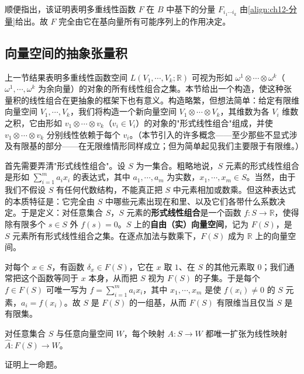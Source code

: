 \documentclass[../../main.tex]{subfiles}
\begin{document}
顺便指出，该证明表明多重线性函数 $F$ 在 $B$ 中基下的分量 $F_{i_1\cdots  i_k}$ 由\eqref{align:ch12-分量}给出。故 $F$ 完全由它在基向量所有可能序列上的作用决定。

\subsection*{向量空间的抽象张量积}

上一节结果表明多重线性函数空间 $L(V_1,\cdots ,V_k;\mathbb{R})$ 可视为形如 $\omega^1\otimes\cdots\otimes\omega^k$（$\omega^1,\cdots ,\omega^k$ 为余向量）的对象的所有线性组合之集。本节给出一个构造，使这种张量积的线性组合在更抽象的框架下也有意义。构造略繁，但想法简单：给定有限维向量空间 $V_1,\cdots ,V_k$，我们将构造一个新向量空间 $V_1\otimes\cdots\otimes V_k$，其维数为各 $V_i$ 维数之积，它由形如 $v_1\otimes\cdots\otimes v_k$（$v_i\in V_i$）的对象的"形式线性组合"组成，并使 $v_1\otimes\cdots\otimes v_k$ 分别线性依赖于每个 $v_i$。（本节引入的许多概念——至少那些不显式涉及有限基的部分——在无限维情形同样成立；但为简单起见我们主要限于有限维。）

首先需要弄清"形式线性组合"。设 $S$ 为一集合。粗略地说，$S$ 元素的形式线性组合是形如 $\sum_{i=1}^m a_i x_i$ 的表达式，其中 $a_1,\cdots ,a_m$ 为实数，$x_1,\cdots ,x_m\in S$。当然，由于我们不假设 $S$ 有任何代数结构，不能真正把 $S$ 中元素相加或数乘。但这种表达式的本质特征是：它完全由 $S$ 中哪些元素出现在和里、以及它们各带什么系数决定。于是定义：对任意集合 $S$，$S$ 元素的\textbf{形式线性组合}是一个函数 $f\colon S\to\mathbb{R}$，使得除有限多个 $s\in S$ 外 $f(s)=0$。$S$ 上的\textbf{自由（实）向量空间}，记为 $F(S)$，是 $S$ 元素所有形式线性组合之集。在逐点加法与数乘下，$F(S)$ 成为 $\mathbb{R}$ 上的向量空间。

对每个 $x\in S$，有函数 $\delta_x\in F(S)$，它在 $x$ 取 $1$、在 $S$ 的其他元素取 $0$；我们通常把这个函数等同于 $x$ 本身，从而把 $S$ 视为 $F(S)$ 的子集。于是每个 $f\in F(S)$ 可唯一写为 $f=\sum_{i=1}^m a_i x_i$，其中 $x_1,\cdots ,x_m$ 是使 $f(x_i)\neq 0$ 的 $S$ 元素，$a_i=f(x_i)$。故 $S$ 是 $F(S)$ 的一组基，从而 $F(S)$ 有限维当且仅当 $S$ 是有限集。

\begin{proposition}[自由向量空间的特征性质]\label{proposition:ch12-自由向量空间特征}
对任意集合 $S$ 与任意向量空间 $W$，每个映射 $A\colon S\to W$ 都唯一扩张为线性映射 $\widehat A\colon F(S)\to W$。
\end{proposition}

\begin{exercise}\label{exercise:ch12-06}
证明上一命题。
\end{exercise}
\end{document}
